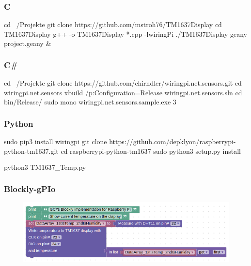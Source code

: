\subsubsection{C}

\begin{console}
	cd ~/Projekte
	git clone https://github.com/mstroh76/TM1637Display
	cd TM1637Display
	g++ -o TM1637Display *.cpp -lwiringPi
	./TM1637Display
	geany project.geany & 
\end{console}


\subsubsection{C\#}

\begin{console}
	cd ~/Projekte
	git clone https://github.com/chirndler/wiringpi.net.sensors.git
	cd wiringpi.net.sensors
	xbuild /p:Configuration=Release wiringpi.net.sensors.sln
	cd bin/Release/
	sudo mono wiringpi.net.sensors.sample.exe 3
\end{console}


\clearpage
\subsubsection{Python}

\begin{console}
	sudo pip3 install wiringpi
	git clone https://github.com/depklyon/raspberrypi-python-tm1637.git
	cd raspberrypi-python-tm1637
	sudo python3 setup.py install
\end{console}

\lstset{language=Python, caption=, 
        label=TM1637Program, frame=single, basicstyle=\ttfamily
	      \footnotesize, breakatwhitespace=false, showstringspaces=false, 
        showtabs=false, tabsize=2 }


\begin{console}
	python3 TM1637_Temp.py
\end{console}


\subsubsection{Blockly-gPIo}

\begin{figure}[ht]
	\centering
	\includegraphics[scale=0.5]{images/Blockly-gPIo_TM1637.png}
	\label{Blockly-gPIo_TM1637}
\end{figure}
